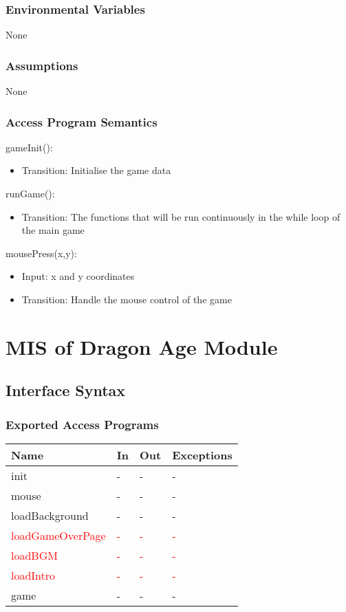 \documentclass[12,english]{article}
\begin{document}
\subsubsection{Environmental Variables}
None
\subsubsection{Assumptions}
None
\subsubsection{Access Program Semantics}

\noindent gameInit():
\begin{itemize}
    \item Transition: Initialise the game data
\end{itemize}

\noindent runGame():
\begin{itemize}
    \item Transition: The functions that will be run continuously in the while loop of the main game
\end{itemize}

\noindent mousePress(x,y):
\begin{itemize}
    \item Input: x and y coordinates
    \item Transition: Handle the mouse control of the game
\end{itemize}

\section{MIS of Dragon Age Module}
\subsection{Interface Syntax}
\subsubsection{Exported Access Programs}
\begin{table}[h!]
    \centering
    \begin{tabular}{|p{4cm}|p{2cm}|p{2cm}|p{2cm}|}
    \hline
    \textbf {Name}  & {In} & {Out} & {Exceptions} \\
    \hline
    init & - & - & -\\
    \hline 
    mouse & - & - & -\\
    \hline 
    loadBackground & - & - & -\\
    \hline 
    \textcolor{red}{loadGameOverPage} & \textcolor{red}{-} & \textcolor{red}{-} & \textcolor{red}{-}\\
    \hline
    \textcolor{red}{loadBGM} & \textcolor{red}{-} & \textcolor{red}{-} & \textcolor{red}{-}\\
    \hline
    \textcolor{red}{loadIntro} & \textcolor{red}{-} & \textcolor{red}{-} & \textcolor{red}{-}\\
    \hline
    game & - & - & -\\
    \hline 
    \end{tabular}
\end{table}
\end{document}
